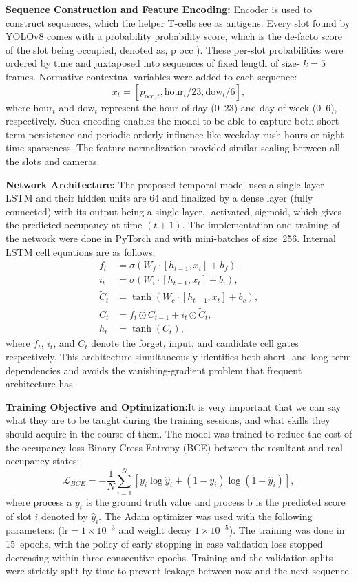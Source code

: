 \documentclass[conference]{IEEEtran}
\begin{document}
\vspace{0.3em}
\noindent\textbf{Sequence Construction and Feature Encoding:}
Encoder is used to construct sequences, which the helper T-cells see as antigens.
Every slot found by YOLOv8 comes with a probability probability score, which is the de-facto score of the slot being occupied, denoted as, p occ ). These per-slot probabilities were ordered by time and juxtaposed into sequences of fixed length of size- $k=5$ frames. Normative contextual variables were added to each sequence:
\[
x_t = [p_{\text{occ},t}, \text{hour}_t/23, \text{dow}_t/6],
\]
where $\text{hour}_t$ and $\text{dow}_t$ represent the hour of day (0–23) and day of week (0–6), respectively. Such encoding enables the model to be able to capture both short term persistence and periodic orderly influence like weekday rush hours or night time sparseness. The feature normalization provided similar scaling between all the slots and cameras.

\vspace{0.3em}
\noindent\textbf{Network Architecture:}
The proposed temporal model uses a single-layer LSTM and their hidden units are 64 and finalized by a dense layer (fully connected) with its output being a single-layer, -activated, sigmoid, which gives the predicted occupancy at time $(t+1)$. The implementation and training of the network were done in PyTorch and with mini-batches of size~256. Internal LSTM cell equations are as follows;
\[
\begin{aligned}
f_t &= \sigma(W_f \cdot [h_{t-1}, x_t] + b_f), \\
i_t &= \sigma(W_i \cdot [h_{t-1}, x_t] + b_i), \\
\tilde{C}_t &= \tanh(W_c \cdot [h_{t-1}, x_t] + b_c), \\
C_t &= f_t \odot C_{t-1} + i_t \odot \tilde{C}_t, \\
h_t &= \tanh(C_t),
\end{aligned}
\]
where $f_t$, $i_t$, and $\tilde{C}_t$ denote the forget, input, and candidate cell gates respectively. This architecture simultaneously identifies both short- and long-term dependencies and avoids the vanishing-gradient problem that frequent architecture has.

\vspace{0.3em}
\noindent\textbf{Training Objective and Optimization:}It is very important that we can say what they are to be taught during the training sessions, and what skills they should acquire in the course of them. The model was trained to reduce the cost of the occupancy loss Binary Cross-Entropy (BCE) between the resultant and real occupancy states:
\[
\mathcal{L}_{BCE} = -\frac{1}{N} \sum_{i=1}^{N} [y_i \log \hat{y}_i + (1-y_i)\log(1-\hat{y}_i)],
\]
where process a $y_i$ is the ground truth value and process b is the predicted score of slot $i$ denoted by $\hat{y}_i$. The Adam optimizer was used with the following parameters: ($\text{lr}=1\times10^{-3}$ and weight decay $1\times10^{-5}$). The training was done in 15~epochs, with the policy of early stopping in case validation loss stopped decreasing within three consecutive epochs. Training and the validation splits were strictly split by time to prevent leakage between now and the next sequence.
\end{document}
